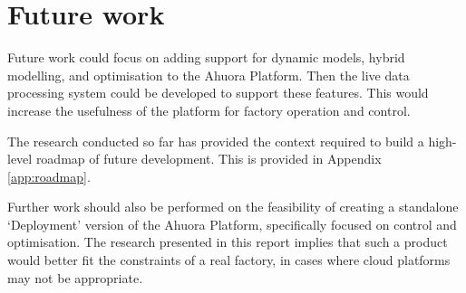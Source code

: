 

\section{Future work}

Future work could focus on adding support for dynamic models, hybrid modelling, and optimisation to the Ahuora Platform. Then the live data processing system could be developed to support these features. 
This would increase the usefulness of the platform for factory operation and control. 


The research conducted so far has provided the context required to build a high-level roadmap of future development. This is provided in Appendix \ref{app:roadmap}.



Further work should also be performed on the feasibility of creating a standalone `Deployment' version of the Ahuora Platform, specifically focused on control and optimisation. The research presented in this report implies that such a product would better fit the constraints of a real factory, in cases where cloud platforms may not be appropriate.





